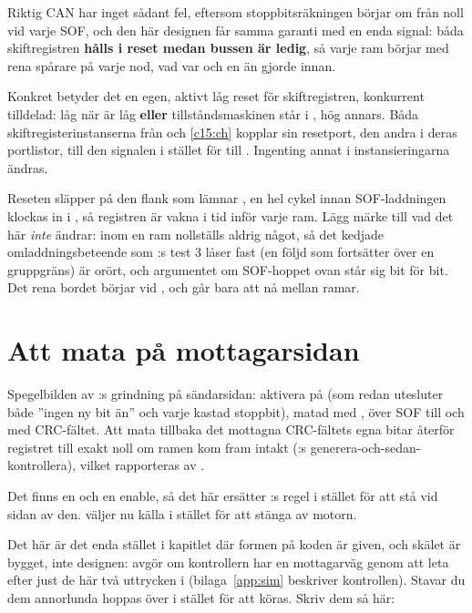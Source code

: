 Riktig CAN har inget sådant fel, eftersom stoppbitsräkningen börjar om från noll vid varje SOF, och
den här designen får samma garanti med en enda signal: båda skiftregistren \textbf{hålls i reset
medan bussen är ledig}, så varje ram börjar med rena spårare på varje nod, vad var och en än gjorde
innan.

Konkret betyder det en egen, aktivt låg reset för skiftregistren, konkurrent tilldelad: låg när
 är låg \textbf{eller} tillståndsmaskinen står i , hög annars.
Båda skiftregisterinstanserna från  och \ref{c15:ch} kopplar sin resetport, den
andra i deras portlistor, till den signalen i stället för till . Ingenting annat i
instansieringarna ändras.

Reseten släpper på den flank som lämnar , en hel cykel innan SOF-laddningen klockas
in i , så registren är vakna i tid inför varje ram. Lägg märke till vad det här
\emph{inte} ändrar: inom en ram nollställs aldrig något, så det kedjade omladdningsbeteende som
:s test 3 låser fast (en följd som fortsätter över en gruppgräns) är orört, och
argumentet om SOF-hoppet ovan står sig bit för bit. Det rena bordet börjar vid , och
 går bara att nå mellan ramar.

\section{Att mata  på mottagarsidan}
\label{c17:sec:crc}

Spegelbilden av :s grindning på sändarsidan: aktivera  på
 (som redan utesluter både ”ingen ny bit än” och varje kastad
stoppbit), matad med , över SOF till och med CRC-fältet. Att mata tillbaka
det mottagna CRC-fältets egna bitar återför registret till exakt noll om ramen kom fram intakt
(:s generera-och-sedan-kontrollera), vilket rapporteras av .

Det finns en  och en enable, så det här ersätter :s regel i stället för
att stå vid sidan av den.  väljer nu källa i stället för att stänga av motorn.

Det här är det enda stället i kapitlet där formen på koden är given, och skälet är bygget, inte
designen:  avgör om kontrollern har en mottagarväg genom att leta efter just
de här två uttrycken i  (bilaga~\ref{app:sim} beskriver kontrollen). Stavar
du dem annorlunda hoppas  över i stället för att köras. Skriv dem så här:

